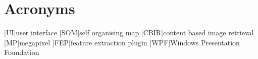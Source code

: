 %
%
%
%
%
%


\chapter*{Acronyms}


\begin{acronym}[TDMA]

[UI]{user interface}
[SOM]{self organising map}
[CBIR]{content based image retrieval}
[MP]{megapixel}
[FEP]{feature extraction plugin}
[WPF]{Windows Presentation Foundation}

\end{acronym}
\vfill

\cleardoublepage